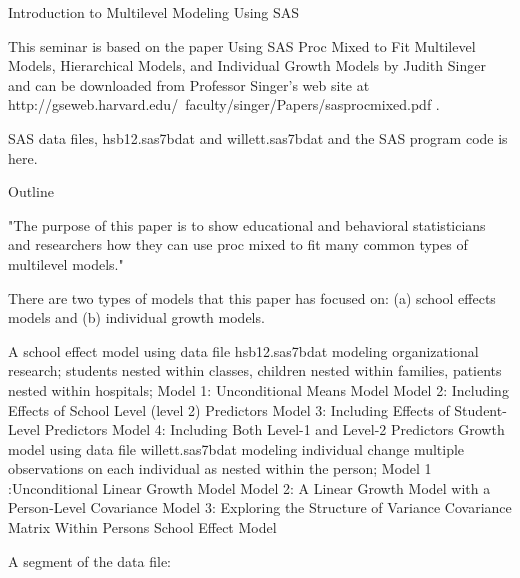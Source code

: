Introduction to Multilevel Modeling Using SAS

This seminar is based on the paper Using SAS Proc Mixed to Fit Multilevel Models, Hierarchical Models, and Individual Growth Models
by Judith Singer and can be downloaded from Professor Singer's web site at http://gseweb.harvard.edu/~faculty/singer/Papers/sasprocmixed.pdf .

SAS data files, hsb12.sas7bdat and willett.sas7bdat and the SAS program code is here.

Outline

"The purpose of this paper is to show educational and behavioral statisticians and researchers how they can use proc mixed to fit many common types of multilevel models."

There are two types of models that this paper has focused on: (a) school effects models and (b) individual growth models.

A school effect model using data file hsb12.sas7bdat
 modeling organizational research;
 students nested within classes, children nested within families, patients nested within hospitals;
Model 1: Unconditional Means Model
Model 2: Including Effects of School Level (level 2) Predictors
Model 3: Including Effects of Student-Level Predictors
Model 4: Including Both Level-1 and Level-2 Predictors
Growth model using data file willett.sas7bdat
 modeling individual change
multiple observations on each individual as nested within the person; 
Model 1 :Unconditional Linear Growth Model
Model 2: A Linear Growth Model with a Person-Level Covariance
Model 3: Exploring the Structure of Variance Covariance Matrix Within Persons
School Effect Model

A segment of the data file:

